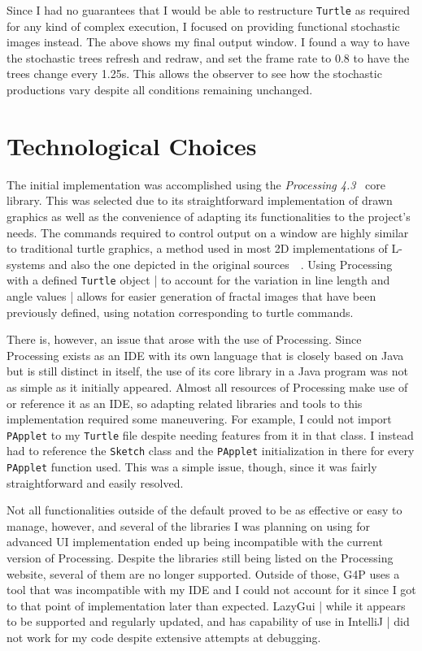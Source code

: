 \documentclass[]{final_report}
\begin{document}
Since I had no guarantees that I would be able to restructure \verb|Turtle| as required for any kind of complex execution, I focused on providing functional stochastic images instead. The above shows my final output window. I found a way to have the stochastic trees refresh and redraw, and set the frame rate to 0.8 to have the trees change every 1.25s. This allows the observer to see how the stochastic productions vary despite all conditions remaining unchanged.

\section{Technological Choices}

The initial implementation was accomplished using the \emph{Processing 4.3}~\cite{PRC} core library. This was selected due to its straightforward implementation of drawn graphics as well as the convenience of adapting its functionalities to the project's needs. The commands required to control output on a window are highly similar to traditional turtle graphics, a method used in most 2D implementations of L-systems and also the one depicted in the original sources~\cite{PRU:1990}~\cite{HAN:1989}. Using Processing with a defined \verb|Turtle| object | to account for the variation in line length and angle values | allows for easier generation of fractal images that have been previously defined, using notation corresponding to turtle commands.

There is, however, an issue that arose with the use of Processing. Since Processing exists as an IDE with its own language that is closely based on Java but is still distinct in itself, the use of its core library in a Java program was not as simple as it initially appeared. Almost all resources of Processing make use of or reference it as an IDE, so adapting related libraries and tools to this implementation required some maneuvering. For example, I could not import \verb|PApplet| to my \verb|Turtle| file despite needing features from it in that class. I instead had to reference the \verb|Sketch| class and the \verb|PApplet| initialization in there for every \verb|PApplet| function used. This was a simple issue, though, since it was fairly straightforward and easily resolved.

Not all functionalities outside of the default proved to be as effective or easy to manage, however,  and several of the libraries I was planning on using for advanced UI implementation ended up being incompatible with the current version of Processing. Despite the libraries still being listed on the Processing website, several of them are no longer supported. Outside of those, G4P uses a tool that was incompatible with my IDE and I could not account for it since I got to that point of implementation later than expected. LazyGui | while it appears to be supported and regularly updated, and has capability of use in IntelliJ | did not work for my code despite extensive attempts at debugging.
\end{document}
